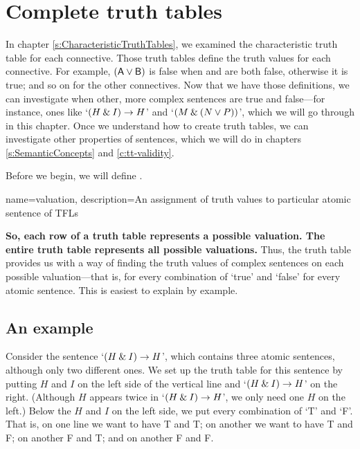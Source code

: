 

\chapter{Complete truth tables}
\label{s:CompleteTruthTables}

In chapter \ref{s:CharacteristicTruthTables}, we examined the characteristic truth table for each connective. Those truth tables define the truth values for each connective. For example, $(\mathsf{A}\vee \mathsf{B})$ is false when  and  are both false, otherwise it is true; and so on for the other connectives. Now that we have those definitions, we can investigate when other, more complex sentences are true and false---for instance, ones like `$(H\mathbin{\&} I)\rightarrow H$' and `$(M \mathbin{\&} (N \vee P))$', which we will go through in this chapter. Once we understand how to create truth tables, we can investigate other properties of sentences, which we will do in chapters \ref{s:SemanticConcepts} and \ref{c:tt-validity}. 

Before we begin, we will define .

{
name=valuation,
description={An assignment of \glspl{truth value} to particular atomic \glspl{sentence of TFL}}
}

\noindent \textbf{So, each row of a truth table represents a possible valuation. The entire truth table represents all possible valuations.} Thus, the truth table provides us with a way of finding the truth values of complex sentences on each possible valuation---that is, for every combination of `true' and `false' for every atomic sentence. This is easiest to explain by example.

\section{An example}\label{s:tt-example}
Consider the sentence `$(H\mathbin{\&} I)\rightarrow H$', which contains three atomic sentences, although only two different ones. We set up the truth table for this sentence by putting $H$ and $I$ on the left side of the vertical line and `$(H\mathbin{\&} I)\rightarrow H$' on the right. (Although $H$ appears twice in `$(H\mathbin{\&} I)\rightarrow H$', we only need one $H$ on the left.) Below the $H$ and $I$ on the left side, we put every combination of `T' and `F'. That is, on one line we want to have T and T; on another we want to have T and F; on another F and T; and on another F and F. 

